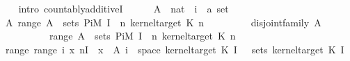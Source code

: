 \begin{isabellebody}
\ \ \isamarkupfalse%
\ {\isacharparenleft}{\kern0pt}intro\ countably{\isacharunderscore}{\kern0pt}additiveI{\isacharparenright}{\kern0pt}\isanewline
\ \ \ \ \isamarkupfalse%
\ A\ {\isacharcolon}{\kern0pt}{\isacharcolon}{\kern0pt}\ {\isachardoublequoteopen}nat\ {\isasymRightarrow}\ {\isacharparenleft}{\kern0pt}{\isacharprime}{\kern0pt}i\ {\isasymRightarrow}\ {\isacharprime}{\kern0pt}a{\isacharparenright}{\kern0pt}\ set{\isachardoublequoteclose}\isanewline
\ \ \ \ \isamarkupfalse%
\ A{\isacharcolon}{\kern0pt}\ {\isachardoublequoteopen}range\ A\ {\isasymsubseteq}\ sets\ {\isacharparenleft}{\kern0pt}Pi\isactrlsub M\ {\isacharbraceleft}{\kern0pt}I\ {}{\isacharbraceright}{\kern0pt}\ {\isacharparenleft}{\kern0pt}{\isasymlambda}n{\isachardot}{\kern0pt}\ kernel{\isacharunderscore}{\kern0pt}target\ {\isacharparenleft}{\kern0pt}K\ n{\isacharparenright}{\kern0pt}{\isacharparenright}{\kern0pt}{\isacharparenright}{\kern0pt}{\isachardoublequoteclose}\isanewline
\ \ \ \ \ \ \ \ \ {\isachardoublequoteopen}disjoint{\isacharunderscore}{\kern0pt}family\ A{\isachardoublequoteclose}\isanewline
\ \ \ \ \ \ \ \ \ {\isachardoublequoteopen}{\isasymUnion}\ {\isacharparenleft}{\kern0pt}range\ A{\isacharparenright}{\kern0pt}\ {\isasymin}\ sets\ {\isacharparenleft}{\kern0pt}Pi\isactrlsub M\ {\isacharbraceleft}{\kern0pt}I\ {}{\isacharbraceright}{\kern0pt}\ {\isacharparenleft}{\kern0pt}{\isasymlambda}n{\isachardot}{\kern0pt}\ kernel{\isacharunderscore}{\kern0pt}target\ {\isacharparenleft}{\kern0pt}K\ n{\isacharparenright}{\kern0pt}{\isacharparenright}{\kern0pt}{\isacharparenright}{\kern0pt}{\isachardoublequoteclose}\isanewline
\ \ \ \ \isamarkupfalse%
\ range{\isacharcolon}{\kern0pt}\ {\isachardoublequoteopen}range\ {\isacharparenleft}{\kern0pt}{\isasymlambda}i{\isachardot}{\kern0pt}\ {\isacharparenleft}{\kern0pt}{\isasymlambda}x{\isachardot}{\kern0pt}\ {\isasymlambda}n{\isasymin}{\isacharbraceleft}{\kern0pt}I\ {}{\isacharbraceright}{\kern0pt}{\isachardot}{\kern0pt}\ x{\isacharparenright}{\kern0pt}\ {\isacharminus}{\kern0pt}{\isacharbackquote}{\kern0pt}\ A\ i\ {\isasyminter}\ space\ {\isacharparenleft}{\kern0pt}kernel{\isacharunderscore}{\kern0pt}target\ {\isacharparenleft}{\kern0pt}K\ {\isacharparenleft}{\kern0pt}I\ {}{\isacharparenright}{\kern0pt}{\isacharparenright}{\kern0pt}{\isacharparenright}{\kern0pt}{\isacharparenright}{\kern0pt}\ {\isasymsubseteq}\ sets\ {\isacharparenleft}{\kern0pt}kernel{\isacharunderscore}{\kern0pt}target\ {\isacharparenleft}{\kern0pt}K\ {\isacharparenleft}{\kern0pt}I\ {}{\isacharparenright}{\kern0pt}{\isacharparenright}{\kern0pt}{\isacharparenright}{\kern0pt}{\isachardoublequoteclose}\isanewline

\end{isabellebody}
